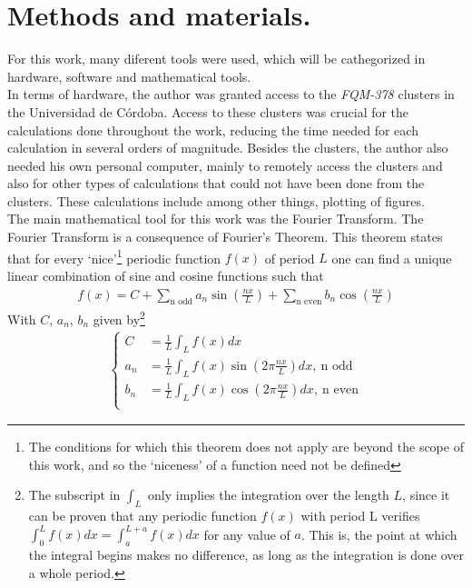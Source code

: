 \chapter{Methods and materials.}
\label{cha:met-mat}

For this work, many diferent tools were used, which will be cathegorized in hardware, software and mathematical tools. \\

In terms of hardware, the author was granted access to the \textit{FQM-378} clusters in the Universidad de Córdoba. Access to these clusters was crucial for the calculations done throughout the work, reducing the time needed for each calculation in several orders of magnitude. Besides the clusters, the author also needed his own personal computer, mainly to remotely access the clusters and also for other types of calculations that could not have been done from the clusters. These calculations include among other things, plotting of figures.  \\

The main mathematical tool for this work was the Fourier Transform. The Fourier Transform is a consequence of Fourier's Theorem. This theorem states that for every `nice'\footnote{The conditions for which this theorem does not apply are beyond the scope of this work, and so the `niceness' of a function need not be defined} periodic function $f(x)$ of period $L$ one can find a unique linear combination of sine and cosine functions such that 
\begin{align}
	f(x) = C + \sum_\text{n odd} a_n \sin\left( \frac{nx}{L} \right) + \sum_{\text{n even}}^{} b_n \cos \left( \frac{nx}{L} \right) 
\end{align}
With $C $, $a_n$, $b_n$ given by\footnote{The subscript in $\int_{L}^{} $ only implies the integration over the length $L$, since it can be proven that any periodic function $f(x)$ with period L verifies $ \int_{0}^{L} f(x)dx = \int_{a}^{L+a} f(x)dx $ for any value of $a$. This is, the point at which the integral begins makes no difference, as long as the integration is done over a whole period. }
\begin{align}
	\begin{cases}
		C &= \frac{1}{L} \int_{L}^{} f(x) dx\\
		a_n &= \frac{1}{L} \int_{L}^{} f(x) \sin\left(  2\pi \frac{nx}{L} \right) dx,~\text{n odd}\\
		b_n &= \frac{1}{L} \int_{L}^{} f(x) \cos\left(  2\pi \frac{nx}{L} \right) dx,~\text{n even}\\
	\end{cases}
\end{align}

